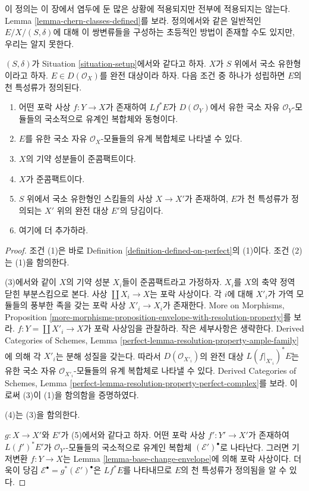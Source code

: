 \noindent
이 정의는 이 장에서 염두에 둔 많은 상황에 적용되지만 전부에
적용되지는 않는다. Lemma \ref{lemma-chern-classes-defined}를 보라.
정의에서와 같은 일반적인 $E/X/(S,\delta)$에 대해 이 쌍변류들을
구성하는 초등적인 방법이 존재할 수도 있지만, 우리는 알지 못한다.

\begin{lemma}
\label{lemma-chern-classes-defined}
$(S, \delta)$가 Situation \ref{situation-setup}에서와 같다고 하자.
$X$가 $S$ 위에서 국소 유한형이라고 하자.
$E \in D(\mathcal{O}_X)$를 완전 대상이라 하자. 다음 조건 중 하나가
성립하면 $E$의 천 특성류가 정의된다.
\begin{enumerate}
\item 어떤 포락 사상 $f : Y \to X$가 존재하여 $Lf^*E$가
$D(\mathcal{O}_Y)$에서 유한 국소 자유 $\mathcal{O}_Y$-모듈들의
국소적으로 유계인 복합체와 동형이다.
\item $E$를 유한 국소 자유 $\mathcal{O}_X$-모듈들의 유계
복합체로 나타낼 수 있다.
\item $X$의 기약 성분들이 준콤팩트이다.
\item $X$가 준콤팩트이다.
\item $S$ 위에서 국소 유한형인 스킴들의 사상 $X \to X'$가
존재하여, $E$가 천 특성류가 정의되는 $X'$ 위의 완전 대상 $E'$의
당김이다.
\item 여기에 더 추가하라.
\end{enumerate}
\end{lemma}

\begin{proof}
조건 (1)은 바로 Definition \ref{definition-defined-on-perfect}의
(1)이다. 조건 (2)는 (1)을 함의한다.

\medskip\noindent
(3)에서와 같이 $X$의 기약 성분 $X_i$들이 준콤팩트라고 가정하자.
$X_i$를 $X$의 축약 정역 닫힌 부분스킴으로 본다.
사상 $\coprod X_i \to X$는 포락 사상이다. 각 $i$에 대해
$X'_i$가 가역 모듈들의 풍부한 족을 갖는 포락 사상
$X'_i \to X_i$가 존재한다. More on Morphisms, Proposition
\ref{more-morphisms-proposition-envelope-with-resolution-property}를
보라. $f : Y = \coprod X'_i \to X$가 포락 사상임을 관찰하라.
작은 세부사항은 생략한다. Derived Categories of Schemes, Lemma
\ref{perfect-lemma-resolution-property-ample-family}에 의해
각 $X'_i$는 분해 성질을 갖는다. 따라서
$D(\mathcal{O}_{X'_i})$의 완전 대상 $L(f|_{X'_i})^*E$는
유한 국소 자유 $\mathcal{O}_{X'_i}$-모듈들의 유계 복합체로 나타낼
수 있다. Derived Categories of Schemes, Lemma
\ref{perfect-lemma-resolution-property-perfect-complex}를 보라.
이로써 (3)이 (1)을 함의함을 증명하였다.

\medskip\noindent
(4)는 (3)을 함의한다.

\medskip\noindent
$g : X \to X'$와 $E'$가 (5)에서와 같다고 하자. 어떤 포락 사상
$f' : Y' \to X'$가 존재하여 $L(f')^*E'$가
$\mathcal{O}_{Y'}$-모듈들의 국소적으로 유계인 복합체
$(\mathcal{E}')^\bullet$로 나타난다. 그러면 기저변환
$f : Y \to X$는 Lemma \ref{lemma-base-change-envelope}에 의해
포락 사상이다. 더욱이 당김
$\mathcal{E}^\bullet = g^*(\mathcal{E}')^\bullet$은 $Lf^*E$를
나타내므로 $E$의 천 특성류가 정의됨을 알 수 있다.
\end{proof}

